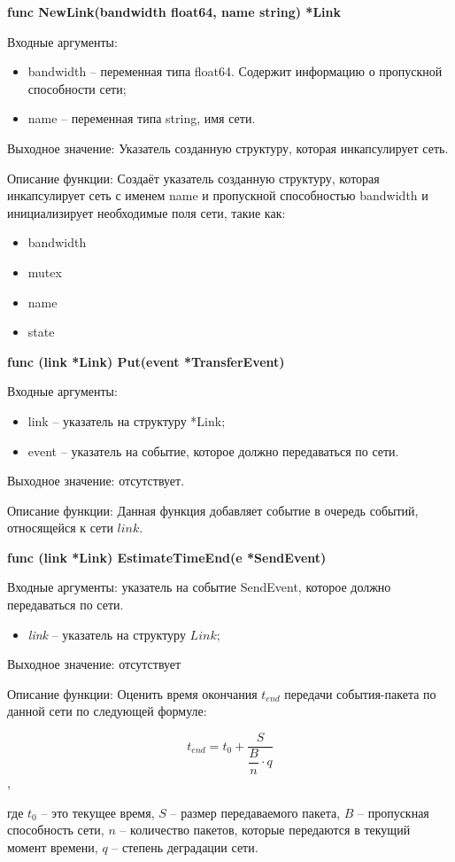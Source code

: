 \textbf{func NewLink(bandwidth float64, name string) *Link}

Входные аргументы:
\begin{itemize}
 \item bandwidth -- переменная типа float64. Содержит информацию о пропускной способности сети;
 \item name -- переменная типа string, имя сети. 
\end{itemize}
Выходное значение: Указатель созданную структуру, которая инкапсулирует сеть. 

Описание функции: Создаёт указатель созданную структуру, которая инкапсулирует сеть с именем name и пропускной способностью bandwidth и инициализирует необходимые поля сети, такие как:

\begin{itemize}
	\item bandwidth 
	\item mutex    
	\item name   
	\item state  
\end{itemize}

\textbf{func (link *Link) Put(event *TransferEvent)}

Входные аргументы:
\begin{itemize}
	\item  link -- указатель на структуру *Link;
	\item event -- указатель на событие, которое должно передаваться по сети.
\end{itemize}
Выходное значение: отсутствует.

Описание функции: Данная функция добавляет событие в очередь событий, относящейся к сети $link$. 


\textbf{func (link *Link) EstimateTimeEnd(e *SendEvent)}

Входные аргументы: указатель на событие SendEvent, которое должно передаваться по сети.
\begin{itemize}
	\item \textit{link} -- указатель на структуру $Link$; 
\end{itemize}
Выходное значение: отсутствует

Описание функции: Оценить время окончания  $t_{end}$ передачи события-пакета по данной сети по следующей формуле:

\[ t_{end} = t_0 + \dfrac{S}{\dfrac{B}{n}  \cdot q }  \], 

где $t_0$ -- это текущее время, \(S\) -- размер передаваемого пакета,  \(B\) -- пропускная способность сети, \(n\) -- количество пакетов, которые передаются в текущий момент времени,  \(q\) -- степень деградации сети. 


